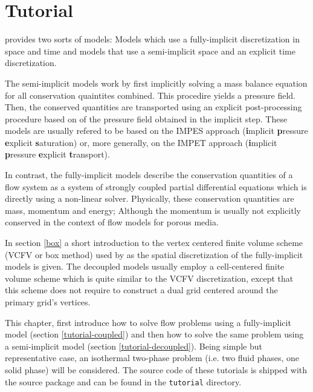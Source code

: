 \chapter[Tutorial]{Tutorial}\label{chp:tutorial}

\eWoms provides two sorts of models: Models which use a fully-implicit
discretization in space and time and models that use a
semi-implicit space and an explicit time discretization.

The semi-implicit models work by first implicitly solving a mass
balance equation for all conservation quaintites combined. This
procedire yields a pressure field. Then, the conserved quantities are
transported using an explicit post-processing procedure based on of
the pressure field obtained in the implicit step. These models are
usually refered to be based on the IMPES approach (\textbf{i}mplicit
\textbf{p}ressure \textbf{e}xplicit \textbf{s}aturation) or, more
generally, on the IMPET approach (\textbf{i}mplicit \textbf{p}ressure
\textbf{e}xplicit \textbf{t}ransport).

In contrast, the fully-implicit models describe the conservation
quantities of a flow system as a system of strongly coupled partial
differential equations which is directly using a non-linear
solver. Physically, these conservation quantities are mass, momentum
and energy; Although the momentum is usually not explicitly conserved
in the context of flow models for porous media.

In section \ref{box} a short introduction to the vertex centered
finite volume scheme (VCFV or box method) used by \eWoms as the
spatial discretization of the fully-implicit models is given. The
decoupled models usually employ a cell-centered finite volume scheme
which is quite similar to the VCFV discretization, except that this
scheme does not require to construct a dual grid centered around the
primary grid's vertices.

This chapter, first introduce how to solve flow problems using a
fully-implicit model (section \ref{tutorial-coupled}) and then how to
solve the same problem using a semi-implicit model (section
\ref{tutorial-decoupled}). Being simple but representative case, an
isothermal two-phase problem (i.e. two fluid phases, one solid phase)
will be considered. The source code of these tutorials is shipped with
the \eWoms source package and can be found in the \texttt{tutorial}
directory.



%

